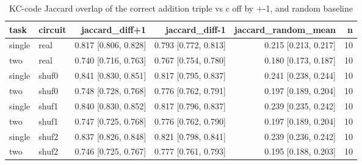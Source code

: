 \begin{table}[t]
\centering
\small
\begin{tabular}{llrrrr}
\toprule
task & circuit & jaccard\_diff+1 & jaccard\_diff-1 & jaccard\_random\_mean & n \\
\midrule
single & real & 0.817 [0.806, 0.828] & 0.793 [0.772, 0.813] & 0.215 [0.213, 0.217] & 10 \\
two & real & 0.740 [0.716, 0.763] & 0.767 [0.754, 0.780] & 0.180 [0.173, 0.187] & 10 \\
single & shuf0 & 0.841 [0.830, 0.851] & 0.817 [0.795, 0.837] & 0.241 [0.238, 0.244] & 10 \\
two & shuf0 & 0.748 [0.728, 0.768] & 0.776 [0.762, 0.791] & 0.197 [0.189, 0.204] & 10 \\
single & shuf1 & 0.840 [0.830, 0.852] & 0.817 [0.796, 0.837] & 0.239 [0.235, 0.242] & 10 \\
two & shuf1 & 0.747 [0.725, 0.768] & 0.776 [0.762, 0.790] & 0.197 [0.189, 0.204] & 10 \\
single & shuf2 & 0.837 [0.826, 0.848] & 0.821 [0.798, 0.841] & 0.239 [0.236, 0.242] & 10 \\
two & shuf2 & 0.746 [0.725, 0.767] & 0.777 [0.761, 0.793] & 0.195 [0.188, 0.203] & 10 \\
\bottomrule
\end{tabular}
\caption{KC-code Jaccard overlap of the correct addition triple vs c off by +-1, and random baseline}
\label{tab:wiring_kc_overlap}
\end{table}